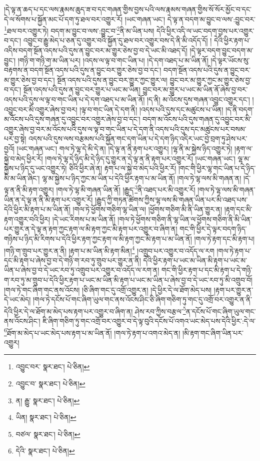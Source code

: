 །དེ་ལྟ་ན་ཆད་པ་དང་ལས་རྣམས་ཆུད་ཟ་བ་དང་གཞན་གྱིས་བྱས་པའི་ལས་རྣམས་གཞན་གྱིས་སོ་སོར་མྱོང་བ་དང་དེ་ལ་སོགས་པ་སྐྱོན་མང་པོ་དག་ཏུ་ཐལ་བར་འགྱུར་རོ། །ཡང་གཞན་ཡང་། དེ་ལྟ་ན་བདག་མ་བྱུང་བ་ལས་:བྱུང་བར་\footnote{འབྱུང་བར་  སྣར་ཐང་།  པེ་ཅིན། }ཐལ་བར་འགྱུར་ཏེ། བདག་མ་བྱུང་བ་ལས་:བྱུང་བ་\footnote{འབྱུང་བ་  སྣར་ཐང་།  པེ་ཅིན། }ནི་མ་ཡིན་པས། དེའི་ཕྱིར་འདི་ལ་ཡང་བདག་བྱས་པར་འགྱུར་བ་དང་། འབྱུང་བ་རྒྱུ་མེད་པ་ཅན་དུ་འགྱུར་བའི་སྐྱོན་དུ་ཐལ་བར་འགྱུར་བས་དེ་ནི་མི་འདོད་དོ། །
དེའི་ཕྱིར་རྟག་པ་འདིས་བདག་སྔོན་འདས་པའི་དུས་ན་བྱུང་བར་མ་གྱུར་ཅེས་བྱ་བ་དེ་ཡང་མི་འཐད་དོ། །དེ་ལྟར་བདག་བྱུང་བདག་མ་བྱུང་། །གཉི་ག་གཉི་ག་མ་ཡིན་པར། །འདས་ལ་ལྟ་བ་གང་ཡིན་པ། །དེ་དག་འཐད་པ་མ་ཡིན་ནོ། །དེ་ལྟར་ཡོངས་སུ་བརྟགས་ན་བདག་སྔོན་འདས་པའི་དུས་ན་བྱུང་བར་གྱུར་ཅེས་བྱ་བ་དང་། བདག་སྔོན་འདས་པའི་དུས་ན་བྱུང་བར་མ་གྱུར་ཅེས་བྱ་བ་དང་། སྔོན་འདས་པའི་དུས་ན་བྱུང་བར་གྱུར་ཀྱང་གྱུར་ལ། བྱུང་བར་མ་གྱུར་ཀྱང་མ་གྱུར་ཅེས་བྱ་བ་དང་། སྔོན་འདས་པའི་དུས་ན་བྱུང་བར་གྱུར་པ་ཡང་མ་ཡིན། བྱུང་བར་མ་གྱུར་པ་ཡང་མ་ཡིན་ནོ་ཞེས་བྱ་བར་འདས་པའི་དུས་ལ་ལྟ་བ་གང་ཡིན་པ་དེ་དག་འཐད་པ་མ་ཡིན་ནོ། །ད་ནི། མ་འོངས་དུས་གཞན་འབྱུང་འགྱུར་དང་། །འབྱུང་བར་མི་འགྱུར་ཞེས་བྱ་བར། །ལྟ་བ་གང་ཡིན་དེ་དག་ནི། །འདས་པའི་དུས་དང་མཚུངས་པ་ཡིན། །ད་ནི་བདག་མ་འོངས་པའི་དུས་གཞན་དུ་འབྱུང་བར་འགྱུར་ཞེས་བྱ་བ་དང་། བདག་མ་འོངས་པའི་དུས་གཞན་དུ་འབྱུང་བར་མི་འགྱུར་ཞེས་བྱ་བར་མ་འོངས་པའི་དུས་ལ་ལྟ་བ་གང་ཡིན་པ་དེ་དག་ནི་འདས་པའི་དུས་དང་མཚུངས་པར་བསམ་པར་བྱ་སྟེ། འདས་པའི་དུས་ལས་བརྩམས་པའི་སྐྱོན་གང་དག་ཡིན་པ་དེ་དག་ཉིད་འདིར་ཡང་བྱེ་བྲག་ཏུ་ཤེས་པར་བྱའོ། །ཡང་གཞན་ཡང་། གལ་ཏེ་ལྷ་དེ་མི་དེ་ན། །དེ་ལྟ་ན་ནི་རྟག་པར་འགྱུར། །ལྷ་ནི་མ་སྐྱེས་ཉིད་འགྱུར་ཏེ། །རྟག་ལ་སྐྱེ་བ་མེད་ཕྱིར་རོ། །གལ་ཏེ་ལྷ་དེ་ཉིད་མི་དེ་ཉིད་དུ་གྱུར་ན་དེ་ལྟ་ན་ནི་རྟག་པར་འགྱུར་རོ། །ཡང་གཞན་ཡང་། ལྷ་མ་སྐྱེས་པ་ཉིད་དུ་ཡང་འགྱུར་ཏེ། ཅིའི་ཕྱིར་ཞེ་ན། རྟག་པ་ལ་སྐྱེ་བ་མེད་པའི་ཕྱིར་རོ། །གང་གི་ཕྱིར་ལྷ་གང་ཡིན་པ་དེ་ཉིད་མི་མ་ཡིན་ཞིང་། ལྷ་མ་སྐྱེས་པ་ཉིད་ཀྱང་མ་ཡིན་པ་དེའི་ཕྱིར་རྟག་པ་མ་ཡིན་ནོ། །གལ་ཏེ་ལྷ་ལས་མི་གཞན་ན། །དེ་ལྟ་ན་ནི་མི་རྟག་འགྱུར། །གལ་ཏེ་ལྷ་མི་གཞན་ཡིན་ནོ། །རྒྱུད་\footnote{ན། རྒྱུ་  སྣར་ཐང་།  པེ་ཅིན། }ནི་འཐད་པར་མི་འགྱུར་རོ། །གལ་ཏེ་ལྷ་ལས་མི་གཞན་ཡིན་ན་དེ་ལྟ་ན་ནི་མི་རྟག་པར་འགྱུར་རོ། །རྒྱུད་ཀྱི་གཏན་ཚིགས་ཀྱིས་ལྷ་ལས་མི་གཞན་ཡིན་པར་མི་འཐད་པས་དེའི་ཕྱིར་མི་རྟག་པ་མ་ཡིན་ནོ། །གལ་ཏེ་ཕྱོགས་གཅིག་ལྷ་ཡིན་ལ། །ཕྱོགས་གཅིག་མི་ནི་ཡིན་གྱུར་ན། །རྟག་དང་མི་རྟག་འགྱུར་བའི་ཕྱིར། །དེ་ཡང་རིགས་པ་མ་ཡིན་ནོ། །གལ་ཏེ་ཕྱོགས་གཅིག་ནི་ལྷ་ཡིན་ལ་ཕྱོགས་གཅིག་ནི་མི་ཡིན་པར་གྱུར་ན་དེ་ལྟ་ན་རྟག་ཀྱང་རྟག་ལ་མི་རྟག་ཀྱང་མི་རྟག་པར་འགྱུར་བ་ཞིག་ན། གང་གི་ཕྱིར་དེ་ལྟར་བདག་ཉིད་གཉིས་པ་ཉིད་མི་རིགས་པ་དེའི་ཕྱིར་རྟག་ཀྱང་རྟག་ལ་མི་རྟག་ཀྱང་མི་རྟག་པ་མ་ཡིན་ནོ། །གལ་ཏེ་རྟག་དང་མི་རྟག་པ། །གཉི་ག་གྲུབ་པར་གྱུར་ན་ནི། །རྟག་པ་མ་ཡིན་མི་རྟག་མིན།\footnote{ཡིན།  སྣར་ཐང་།  པེ་ཅིན། } །འགྲུབ་པར་འགྱུར་བ་འདོད་ལ་རག །གལ་ཏེ་རྟག་པ་དང་མི་རྟག་པ་ཞེས་བྱ་བ་དེ་གཉི་ག་རབ་ཏུ་གྲུབ་པར་གྱུར་ན་ནི། དེའི་ཕྱིར་རྟག་པ་ཡང་མ་ཡིན་མི་རྟག་པ་ཡང་མ་ཡིན་པ་ཞེས་བྱ་བ་དེ་ཡང་རབ་ཏུ་འགྲུབ་པར་འགྱུར་བ་འདོད་ལ་རག་ན། གང་གི་ཕྱིར་རྟག་པ་དང་མི་རྟག་པ་དེ་གཉི་ག་རབ་ཏུ་མ་གྲུབ་པ་དེའི་ཕྱིར་རྟག་པ་ཡང་མ་ཡིན་མི་རྟག་པ་ཡང་མ་ཡིན་པ་ཞེས་བྱ་བ་དེ་ཡང་རབ་ཏུ་མི་འགྲུབ་བོ། །གལ་ཏེ་གང་ཞིག་གང་ནས་འོངས། །ཅི་ཞིག་གང་དུ་འགྲོ་འགྱུར་ན། །དེ་ཕྱིར་དེ་ལ་ཐོག་མེད་པས། །རྟག་པར་གྱུར་ན་དེ་ཡང་མེད། །གལ་ཏེ་དངོས་པོ་གང་ཞིག་ཡུལ་གང་ནས་འོངས་ཤིང་ཅི་ཞིག་གཅིག་ཏུ་གང་དུ་འགྲོ་བར་འགྱུར་ན་ནི་དེའི་ཕྱིར་དེ་ལ་ཐོག་མ་མེད་པས་རྟག་པར་འགྱུར་བ་ཞིག་ན། ཤེས་རབ་ཀྱིས་བརྩལ་\footnote{བཙལ་  སྣར་ཐང་།  པེ་ཅིན། }ན་དངོས་པོ་གང་ཞིག་ཡུལ་གང་ནས་འོངས་ཤིང་། ཇི་ཞིག་གཅིག་ཏུ་གང་འགྲོ་བར་འགྱུར་བ་དེ་ལྟ་བུའི་དངོས་པོ་འགའ་ཡང་མེད་པས་དེའི་ཕྱིར་:དེ་ལ་\footnote{དེའི་  སྣར་ཐང་།  པེ་ཅིན། }ཐོག་མ་མེད་པ་ཡང་མེད་པས་རྟག་པ་མ་ཡིན་ནོ། །གལ་ཏེ་རྟག་པ་འགའ་མེད་ན། །མི་རྟག་གང་ཞིག་ཡིན་པར་འགྱུར། 